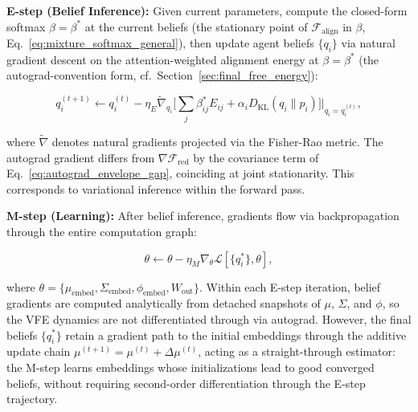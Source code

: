 \documentclass[twoside,11pt]{article}
\begin{document}
\textbf{E-step (Belief Inference):} Given current parameters, compute the closed-form softmax $\beta = \beta^*$ at the current beliefs (the stationary point of $\mathcal{F}_{\mathrm{align}}$ in $\beta$, Eq.~\ref{eq:mixture_softmax_general}), then update agent beliefs $\{q_i\}$ via natural gradient descent on the attention-weighted alignment energy at $\beta = \beta^*$ (the autograd-convention form, cf.\ Section~\ref{sec:final_free_energy}):

\begin{equation}
q_i^{(t+1)} \leftarrow q_i^{(t)} - \eta_E \tilde{\nabla}_{q_i} \big[\textstyle\sum_j \beta_{ij}^* E_{ij} + \alpha_i D_{\mathrm{KL}}(q_i \| p_i)\big]\Big|_{q_i = q_i^{(t)}},
\end{equation}

where $\tilde{\nabla}$ denotes natural gradients projected via the Fisher-Rao metric. The autograd gradient differs from $\nabla\mathcal{F}_{\mathrm{red}}$ by the covariance term of Eq.~\ref{eq:autograd_envelope_gap}, coinciding at joint stationarity. This corresponds to variational inference within the forward pass.

\textbf{M-step (Learning):} After belief inference, gradients flow via backpropagation through the entire computation graph:

\begin{equation}
\theta \leftarrow \theta - \eta_M \nabla_{\theta} \mathcal{L}[\{q_i^*\}, \theta],
\end{equation}

where $\theta = \{\mu_{\text{embed}}, \Sigma_{\text{embed}}, \phi_{\text{embed}}, W_{\text{out}}\}$. Within each E-step iteration, belief gradients are computed analytically from detached snapshots of $\mu$, $\Sigma$, and $\phi$, so the VFE dynamics are not differentiated through via autograd. However, the final beliefs $\{q_i^*\}$ retain a gradient path to the initial embeddings through the additive update chain $\mu^{(t+1)} = \mu^{(t)} + \Delta\mu^{(t)}$, acting as a straight-through estimator: the M-step learns embeddings whose initializations lead to good converged beliefs, without requiring second-order differentiation through the E-step trajectory.
\end{document}
